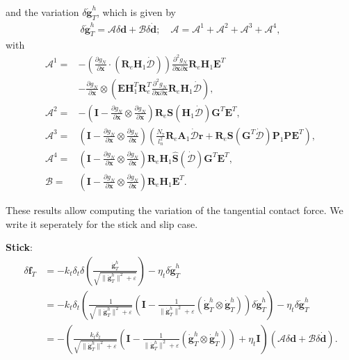 \documentclass[3p]{elsarticle}
\newcommand{\vect}[1]{\boldsymbol{#1}}
\begin{document}
\noindent and the variation $\delta\dot{\vect{g}}_T^h$, which is given by
\begin{align}
	\delta\dot{\vect{g}}_T^h=\vect{\mathcal{A}}\delta\vect{d}+\vect{\mathcal{B}}\delta\dot{\vect{d}};\quad\vect{\mathcal{A}}=\vect{\mathcal{A}}^1+\vect{\mathcal{A}}^2+\vect{\mathcal{A}}^3+\vect{\mathcal{A}}^4\label{eq:deltagdot},
\end{align}
\noindent with
\begin{subequations}
	\begin{align}
		\vect{\mathcal{A}}^1=&-\left(\frac{\partial g_N}{\partial\vect{x}}\cdot(\vect{R}_e\vect{H}_1\dot{\vect{\mathcal{D}}})\right)\frac{\partial^2 g_N}{\partial\vect{x}\partial\vect{x}}\vect{R}_e\vect{H}_1\vect{E}^T\nonumber\\
		&-\frac{\partial g_N }{\partial\vect{x}}\otimes\left(\vect{E}\vect{H}_1^T\vect{R}_e^T\frac{\partial^2 g_N}{\partial\vect{x}\partial\vect{x}}\vect{R}_e\vect{H}_1\dot{\vect{\mathcal{D}}}\right),\\
		\vect{\mathcal{A}}^2=&-\left(\vect{I}-\frac{\partial g_N}{\partial\vect{x}}\otimes\frac{\partial g_N}{\partial\vect{x}}\right)\vect{R}_e\vect{S}(\vect{H}_1\dot{\vect{\mathcal{D}}})\vect{G}^T\vect{E}^T,\\
		\vect{\mathcal{A}}^3=&\left(\vect{I}-\frac{\partial g_N}{\partial\vect{x}}\otimes\frac{\partial g_N}{\partial\vect{x}}\right)\left(\frac{N_7}{l_n^2}\vect{R}_e\vect{A}_1\dot{\vect{\mathcal{D}}}\vect{r}+\vect{R}_e\vect{S}(\vect{G}^T\dot{\vect{\mathcal{D}}})\vect{P}_1\vect{P}\vect{E}^T\right),\\
		\vect{\mathcal{A}}^4=&\left(\vect{I}-\frac{\partial g_N}{\partial\vect{x}}\otimes\frac{\partial g_N}{\partial\vect{x}}\right)\vect{R}_e\vect{H}_1\hat{\vect{S}}(\dot{\vect{\mathcal{D}}})\vect{G}^T\vect{E}^T,\\
		\vect{\mathcal{B}}=&\left(\vect{I}-\frac{\partial g_N}{\partial\vect{x}}\otimes\frac{\partial g_N}{\partial\vect{x}}\right)\vect{R}_e\vect{H}_1\vect{E}^T.
	\end{align}
\end{subequations}

These results allow computing the variation of the tangential contact force. We write it seperately for the stick and slip case.

\noindent\textbf{Stick}:
\begin{align}
	\delta\vect{f}_T&=-k_t\delta_t\delta\left(\frac{\dot{\vect{g}}_T^h}{\sqrt{\|\dot{\vect{g}}_T^h\|^2+\varepsilon}}\right)-\eta_t\delta\dot{\vect{g}}_T^h\\
	&=-k_t\delta_t\left(\frac{1}{\sqrt{\|\dot{\vect{g}}_T^h\|^2+\varepsilon}}\left(\vect{I}-\frac{1}{\|\dot{\vect{g}}_T^h\|^2+\varepsilon}(\dot{\vect{g}}_T^h\otimes\dot{\vect{g}}_T^h)\right)\delta\dot{\vect{g}}_T^h\right)-\eta_t\delta\dot{\vect{g}}_T^h\\
	&=-\left(\frac{k_t\delta_t}{\sqrt{\|\dot{\vect{g}}_T^h\|^2+\varepsilon}}\left(\vect{I}-\frac{1}{\|\dot{\vect{g}}_T^h\|^2+\varepsilon}(\dot{\vect{g}}_T^h\otimes\dot{\vect{g}}_T^h)\right)+\eta_t\vect{I}\right)\left(\vect{\mathcal{A}}\delta\vect{d}+\vect{\mathcal{B}}\delta\dot{\vect{d}}\right).
\end{align}
\end{document}
